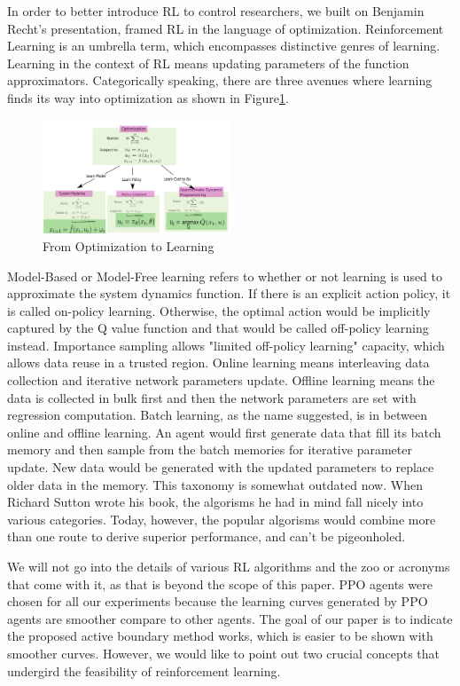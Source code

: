 \documentclass[journal]{IEEEtran}
\begin{document}
In order to better introduce RL to control researchers, we built on Benjamin Recht's presentation\cite{Recht2018ATO}, framed RL in the language of optimization. Reinforcement Learning is an umbrella term, which encompasses distinctive genres of learning. Learning in the context of RL means updating parameters of the function approximators. Categorically speaking, there are three avenues where learning finds its way into optimization as shown in Figure\ref{fig:1}. 
\begin{figure}
    \centering
    \includegraphics[width=0.5\textwidth]{Control.png}
    \caption{From Optimization to Learning}
    \label{fig:1}
\end{figure}

Model-Based or Model-Free learning refers to whether or not learning is used to approximate the system dynamics function. If there is an explicit action policy, it is called on-policy learning. Otherwise, the optimal action would be implicitly captured by the Q value function and that would be called off-policy learning instead. Importance sampling allows "limited off-policy learning" capacity, which allows data reuse in a trusted region. Online learning means interleaving data collection and iterative network parameters update. Offline learning means the data is collected in bulk first and then the network parameters are set with regression computation. Batch learning, as the name suggested, is in between online and offline learning. An agent would first generate data that fill its batch memory and then sample from the batch memories for iterative parameter update. New data would be generated with the updated parameters to replace older data in the memory. This taxonomy is somewhat outdated now. When Richard Sutton wrote his book, the algorisms he had in mind fall nicely into various categories. Today, however, the popular algorisms would combine more than one route to derive superior performance, and can't be pigeonholed.

We will not go into the details of various RL algorithms and the zoo or acronyms that come with it, as that is beyond the scope of this paper. PPO agents were chosen for all our experiments because the learning curves generated by PPO agents are smoother compare to other agents. The goal of our paper is to indicate the proposed active boundary method works, which is easier to be shown with smoother curves. However, we would like to point out two crucial concepts that undergird the feasibility of reinforcement learning.
\end{document}
